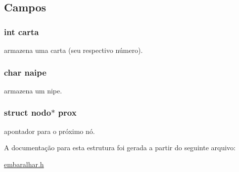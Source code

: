 \subsection{Campos}
\hypertarget{structnodo_a0d153279003388933e082f40da4a3702}{
\subsubsection[{carta}]{\setlength{\rightskip}{0pt plus 5cm}int {\bf carta}}}
\label{structnodo_a0d153279003388933e082f40da4a3702}


armazena uma carta (seu respectivo número). 

\hypertarget{structnodo_aba763958bee1abb2961d0d2e82f8cdfb}{
\subsubsection[{naipe}]{\setlength{\rightskip}{0pt plus 5cm}char {\bf naipe}}}
\label{structnodo_aba763958bee1abb2961d0d2e82f8cdfb}


armazena um nipe. 

\hypertarget{structnodo_a486ad5c9b955ff42eaf8fbf3330e4c75}{
\subsubsection[{prox}]{\setlength{\rightskip}{0pt plus 5cm}struct {\bf nodo}$\ast$ {\bf prox}}}
\label{structnodo_a486ad5c9b955ff42eaf8fbf3330e4c75}


apontador para o próximo nó. 



A documentação para esta estrutura foi gerada a partir do seguinte arquivo:\begin{DoxyCompactItemize}
\item 
\hyperlink{embaralhar_8h}{embaralhar.h}\end{DoxyCompactItemize}
